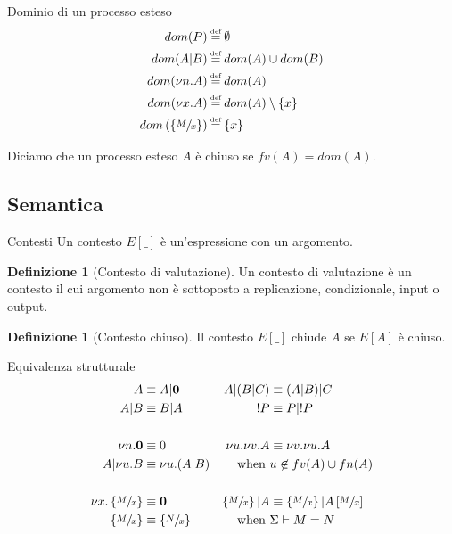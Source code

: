 \documentclass{beamer}
\newcounter{counter1}
\theoremstyle{plain}
\theoremstyle{definition}
\newtheorem{mydef}[counter1]{Definizione}
\theoremstyle{remark}
\newcommand{\set}[1]{\left\{#1\right\}}
\newcommand{\pa}[1]{\left(#1\right)}
\newcommand{\bra}[1]{\left[#1\right]}
\newcommand*{\eqdef}{\ensuremath{\overset{\mathclap{\text{\tiny def}}}{=}}}
\begin{document}
\begin{frame}{Dominio di un processo esteso}
  \begin{align*}
    dom(P) & \eqdef \emptyset \\
    dom(A|B) & \eqdef dom(A) \cup dom(B) \\
    dom(\nu n.A) & \eqdef dom(A) \\
    dom(\nu x.A) & \eqdef dom(A) \setminus \set{x}\\
    dom\pa{ \set{ \sfrac{M}{x}}} & \eqdef \set{x}           
  \end{align*}
  \vfill
  
  Diciamo che un processo esteso $A$ \`e chiuso se $fv(A) = dom(A)$.
\end{frame}

\subsection{Semantica}

\begin{frame}{Contesti}
  Un contesto $E[\_]$ \`e un'espressione con un argomento.
  \begin{mydef}[Contesto di valutazione]
    Un contesto di valutazione \`e un contesto il cui argomento non
    \`e sottoposto a replicazione, condizionale, input o output.
  \end{mydef}
  \begin{mydef}[Contesto chiuso]
    Il contesto $E[\_]$ chiude $A$ se $E[A]$ \`e chiuso.
  \end{mydef}
\end{frame}


\begin{frame}{Equivalenza strutturale}
  \begin{align*}
    A & \equiv A|\mathbf{0} & A|(B|C) & \equiv (A|B)|C \\
    A|B & \equiv B|A & !P & \equiv P|!P \\ \\
    \nu n.\mathbf{0} & \equiv 0 & \nu u. \nu v.A & \equiv \nu v. \nu
                                                   u.A \\
    A| \nu u.B & \equiv \nu u. (A|B) & \text{when } & u\not\in fv(A)
                                                     \cup fn(A) \\ \\
    \nu x. \set{\sfrac{M}{x}} & \equiv \mathbf{0} & \set{\sfrac{M}{x}}
                                                    |A & \equiv
                                                         \set{\sfrac{M}{x}}
                                                         |
                                                         A\bra{\sfrac{M}{x}}
    \\
    \set{\sfrac{M}{x}} & \equiv \set{\sfrac{N}{x}} & \text{when } &
                                                                   \Sigma
                                                                   \vdash M=N
  \end{align*}
\end{frame}
\end{document}
